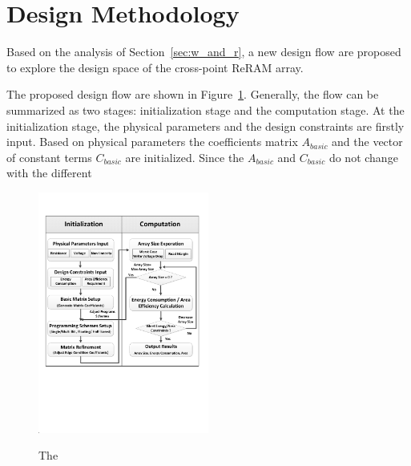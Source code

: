 \vspace{10pt}
\section{Design Methodology}\label{sec:framwork}
Based on the analysis of Section~\ref{sec:w_and_r}, a new design flow are proposed to explore the design space of the cross-point ReRAM array. 

The proposed design flow are shown in Figure~\ref{fig:FlowChart}. Generally, the flow can be summarized as two stages: initialization stage and the computation stage. At the initialization stage, the physical parameters and the design constraints are firstly input. Based on physical parameters the coefficients matrix $A_{basic}$ and the vector of constant terms $C_{basic}$ are initialized. Since the $A_{basic}$ and $C_{basic}$ do not change with the different

\begin{figure}[!t]
\centering
  \includegraphics[width=0.5\textwidth]{./figures/FlowChart.pdf}\\
  \caption{The}\label{fig:FlowChart}
\end{figure}
